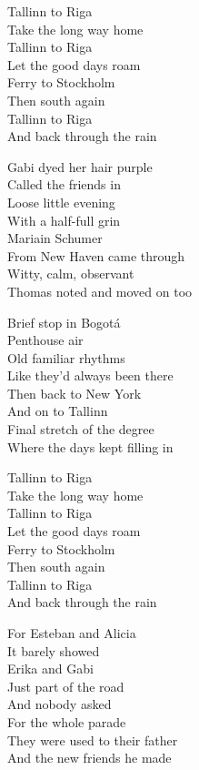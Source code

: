 \begin{lyrics}
Tallinn to Riga\\
Take the long way home\\
Tallinn to Riga\\
Let the good days roam\\
Ferry to Stockholm\\
Then south again\\
Tallinn to Riga\\
And back through the rain

Gabi dyed her hair purple\\
Called the friends in\\
Loose little evening\\
With a half-full grin\\
Mariain Schumer\\
From New Haven came through\\
Witty, calm, observant\\
Thomas noted and moved on too

Brief stop in Bogotá\\
Penthouse air\\
Old familiar rhythms\\
Like they’d always been there\\
Then back to New York\\
And on to Tallinn\\
Final stretch of the degree\\
Where the days kept filling in

Tallinn to Riga\\
Take the long way home\\
Tallinn to Riga\\
Let the good days roam\\
Ferry to Stockholm\\
Then south again\\
Tallinn to Riga\\
And back through the rain

For Esteban and Alicia\\
It barely showed\\
Erika and Gabi\\
Just part of the road\\
And nobody asked\\
For the whole parade\\
They were used to their father\\
And the new friends he made
\end{lyrics}

